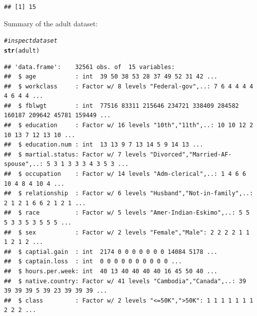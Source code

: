 \documentclass[10pt  ,usenames, dvipsnames]{article}\usepackage[]{graphicx}\usepackage[]{color}
\makeatletter
\newcommand{\hlcom}[1]{\textcolor[rgb]{0.678,0.584,0.686}{\textit{#1}}}%
\newcommand{\hlstd}[1]{\textcolor[rgb]{0.345,0.345,0.345}{#1}}%
\newcommand{\hlkwd}[1]{\textcolor[rgb]{0.737,0.353,0.396}{\textbf{#1}}}%
\newenvironment{kframe}{%
 \def\at@end@of@kframe{}%
 \ifinner\ifhmode%
  \def\at@end@of@kframe{\end{minipage}}%
  \begin{minipage}{\columnwidth}%
 \fi\fi%
 \def\FrameCommand##1{\hskip\@totalleftmargin \hskip-\fboxsep
 \colorbox{shadecolor}{##1}\hskip-\fboxsep
     \hskip-\linewidth \hskip-\@totalleftmargin \hskip\columnwidth}%
 \MakeFramed {\advance\hsize-\width
   \@totalleftmargin\z@ \linewidth\hsize
   \@setminipage}}%
 {\par\unskip\endMakeFramed%
 \at@end@of@kframe}
\newenvironment{knitrout}{}{} %
\makeatother
\begin{document}
\begin{knitrout}
\color{fgcolor}\begin{kframe}
\begin{verbatim}
## [1] 15
\end{verbatim}
\end{kframe}
\end{knitrout}

Summary of the adult dataset:

\begin{knitrout}
\color{fgcolor}\begin{kframe}
\begin{alltt}
\hlcom{#inspect dataset}
\hlkwd{str}\hlstd{(adult)}
\end{alltt}
\end{kframe}
\end{knitrout}

\begin{knitrout}
\color{fgcolor}\begin{kframe}
\begin{verbatim}
## 'data.frame':	32561 obs. of  15 variables:
##  $ age           : int  39 50 38 53 28 37 49 52 31 42 ...
##  $ workclass     : Factor w/ 8 levels "Federal-gov",..: 7 6 4 4 4 4 4 6 4 4 ...
##  $ fblwgt        : int  77516 83311 215646 234721 338409 284582 160187 209642 45781 159449 ...
##  $ education     : Factor w/ 16 levels "10th","11th",..: 10 10 12 2 10 13 7 12 13 10 ...
##  $ education.num : int  13 13 9 7 13 14 5 9 14 13 ...
##  $ martial.status: Factor w/ 7 levels "Divorced","Married-AF-spouse",..: 5 3 1 3 3 3 4 3 5 3 ...
##  $ occupation    : Factor w/ 14 levels "Adm-clerical",..: 1 4 6 6 10 4 8 4 10 4 ...
##  $ relationship  : Factor w/ 6 levels "Husband","Not-in-family",..: 2 1 2 1 6 6 2 1 2 1 ...
##  $ race          : Factor w/ 5 levels "Amer-Indian-Eskimo",..: 5 5 5 3 3 5 3 5 5 5 ...
##  $ sex           : Factor w/ 2 levels "Female","Male": 2 2 2 2 1 1 1 2 1 2 ...
##  $ captial.gain  : int  2174 0 0 0 0 0 0 0 14084 5178 ...
##  $ captain.loss  : int  0 0 0 0 0 0 0 0 0 0 ...
##  $ hours.per.week: int  40 13 40 40 40 40 16 45 50 40 ...
##  $ native.country: Factor w/ 41 levels "Cambodia","Canada",..: 39 39 39 39 5 39 23 39 39 39 ...
##  $ class         : Factor w/ 2 levels "<=50K",">50K": 1 1 1 1 1 1 1 2 2 2 ...
\end{verbatim}
\end{kframe}
\end{knitrout}
\end{document}
